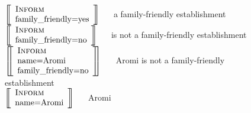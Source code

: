 \begin{figure}
$\left[\!\!\left[ \begin{array}{l} \textsc{Inform}\\ \textrm{family\_friendly=yes} \end{array}   \right]\!\!\right] $  ~~ a family-friendly establishment \\
$\left[\!\!\left[ \begin{array}{l} \textsc{Inform}\\ \textrm{family\_friendly=no} \end{array}   \right]\!\!\right] $  ~~ is not a family-friendly establishment \\
$\left[\!\!\left[ \begin{array}{l} \textsc{Inform}\\ \textrm{name=Aromi} \\ \textrm{family\_friendly=no} \end{array}   \right]\!\!\right] $  ~~ Aromi is not a family-friendly establishment \\
$\left[\!\!\left[ \begin{array}{l} \textsc{Inform}\\ \textrm{name=Aromi} \end{array}   \right]\!\!\right] $  ~~ Aromi \\

\end{figure}
